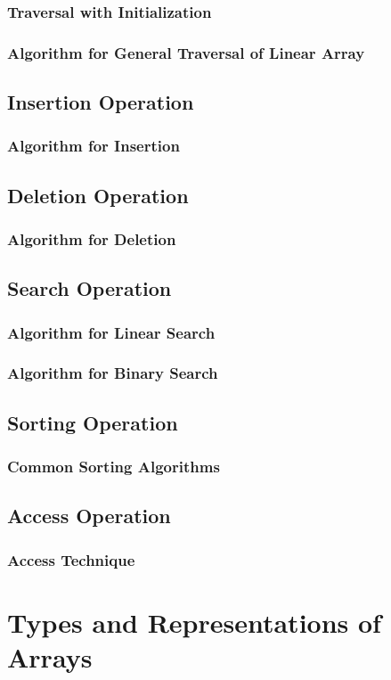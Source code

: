 \documentclass[12pt, oneside]{book}
\begin{document}
\subsection{Traversal with Initialization}
\subsection{Algorithm for General Traversal of Linear Array}
\section{Insertion Operation}
\subsection*{Algorithm for Insertion}
\section{Deletion Operation}
\subsection*{Algorithm for Deletion}
\section{Search Operation}
\subsection*{Algorithm for Linear Search}
\subsection*{Algorithm for Binary Search}
\section{Sorting Operation}
\subsection*{Common Sorting Algorithms}
\section{Access Operation}
\subsection*{Access Technique}
\chapter{Types and Representations of Arrays}
\end{document}
